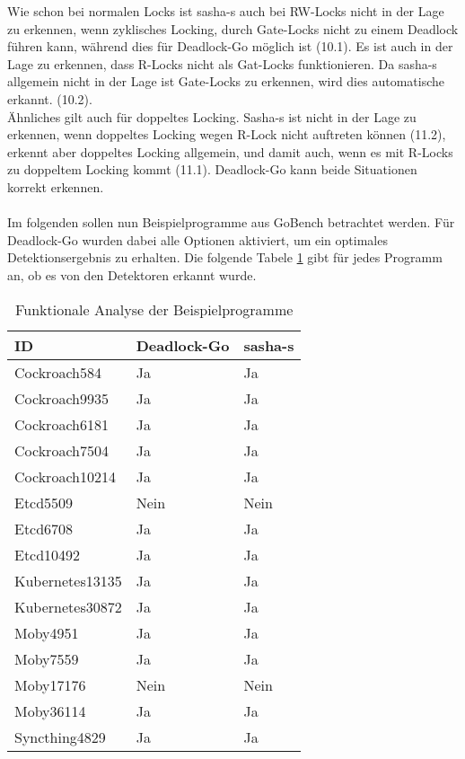 Wie schon bei normalen Locks ist sasha-s auch bei RW-Locks nicht in der Lage 
zu erkennen, wenn zyklisches Locking, durch Gate-Locks nicht zu einem Deadlock 
führen kann, während dies für Deadlock-Go möglich ist (10.1). Es ist auch in der Lage 
zu erkennen, dass R-Locks nicht als Gat-Locks funktionieren. Da sasha-s allgemein 
nicht in der Lage ist Gate-Locks zu erkennen, wird dies automatische erkannt. (10.2).\\
Ähnliches gilt auch für doppeltes Locking. Sasha-s ist 
nicht in der Lage zu erkennen, wenn doppeltes Locking wegen R-Lock nicht auftreten 
können (11.2), erkennt aber doppeltes Locking allgemein, und damit auch, wenn 
es mit R-Locks zu doppeltem Locking kommt (11.1). Deadlock-Go kann beide Situationen
korrekt erkennen.
\\\\
Im folgenden sollen nun Beispielprogramme aus GoBench
betrachtet werden. Für Deadlock-Go wurden dabei alle Optionen aktiviert, um ein 
optimales Detektionsergebnis zu erhalten.
Die folgende Tabele \ref{Tab::Analyse:Functional.Example} gibt für jedes Programm an,
 ob es von den Detektoren erkannt wurde.
\begin{table}[H]
\centering
\begin{tabular}{|l|l|l|}
\hline
\textbf{ID} & \textbf{Deadlock-Go} & \textbf{sasha-s} \\ \hline
Cockroach584 & Ja & Ja \\ \hline
Cockroach9935 & Ja & Ja \\ \hline
Cockroach6181 & Ja & Ja \\ \hline
Cockroach7504 & Ja & Ja \\ \hline
Cockroach10214 & Ja & Ja \\ \hline
Etcd5509 & Nein & Nein \\ \hline
Etcd6708 & Ja & Ja \\ \hline
Etcd10492 & Ja & Ja \\ \hline
Kubernetes13135 & Ja & Ja \\ \hline
Kubernetes30872 & Ja & Ja \\ \hline
Moby4951 & Ja & Ja \\ \hline
Moby7559 & Ja & Ja \\ \hline
Moby17176 & Nein & Nein \\ \hline
Moby36114 & Ja & Ja \\ \hline
Syncthing4829 & Ja & Ja \\ \hline
\end{tabular}
\caption{Funktionale Analyse der Beispielprogramme}
\label{Tab::Analyse:Functional.Example}
\end{table}
